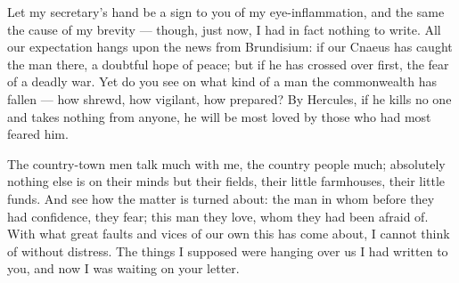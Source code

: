 

 Let my secretary's hand be a sign to you of my eye-inflammation, and the same the cause of my brevity --- though, just now, I had in fact nothing to write. All our expectation hangs upon the news from Brundisium: if our Cnaeus has caught the man there, a doubtful hope of peace; but if he has crossed over first, the fear of a deadly war. Yet do you see on what kind of a man the commonwealth has fallen --- how shrewd, how vigilant, how prepared? By Hercules, if he kills no one and takes nothing from anyone, he will be most loved by those who had most feared him.

 The country-town men talk much with me, the country people much; absolutely nothing else is on their minds but their fields, their little farmhouses, their little funds. And see how the matter is turned about: the man in whom before they had confidence, they fear; this man they love, whom they had been afraid of. With what great faults and vices of our own this has come about, I cannot think of without distress. The things I supposed were hanging over us I had written to you, and now I was waiting on your letter.
